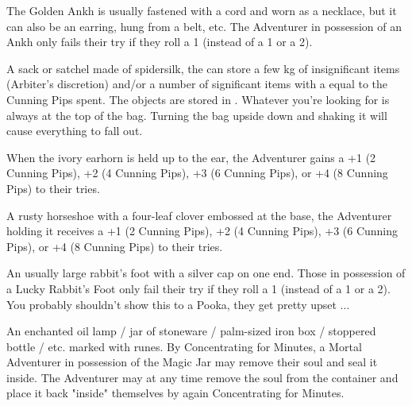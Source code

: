 \MARVELS[
  Name=Golden Ankh,
  Link=marvels-ankh,
  Pips=8
]

The Golden Ankh is usually fastened with a cord and worn as a necklace, but it can also be an earring, hung from a belt, etc. The Adventurer in possession of an Ankh only fails their  try if they roll a 1 (instead of a 1 or a 2).

\MARVELS[
  Name=Hammerspace Bag,
  Link=marvels-hammerspace-bag,
  Pips=2+
]

A sack or satchel made of spidersilk, the  can store a few kg of insignificant items (Arbiter's discretion) and/or a number of significant items with a  equal to the Cunning Pips spent. The objects are stored in . Whatever you're looking for is always at the top of the bag.  Turning the bag upside down and shaking it will cause everything to fall out.

\MARVELS[
  Name=Ivory Earnhorn,
  Link=marvels-ivory-earhorn,
  Pips=2+
]

When the ivory earhorn is held up to the ear, the Adventurer gains a +1 (2 Cunning Pips), +2 (4 Cunning Pips), +3 (6 Cunning Pips), or +4 (8 Cunning Pips) to their  tries.


\MARVELS[
  Name=Lucky Horseshoe,
  Link=marvels-lucky-horseshoe,
  Pips=2+
]

A rusty horseshoe with a four-leaf clover embossed at the base, the Adventurer holding it receives a +1 (2 Cunning Pips), +2 (4 Cunning Pips), +3 (6 Cunning Pips), or +4 (8 Cunning Pips) to their  tries.


\MARVELS[
  Name=Lucky Rabbit's Foot,
  Link=marvels-lucky-rabbits-foot,
  Pips=8
]

An usually large rabbit's foot with a silver cap on one end. Those in possession of a Lucky Rabbit's Foot only fail their  try if they roll a 1 (instead of a 1 or a 2). You probably shouldn't show this to a Pooka, they get pretty upset ...


\MARVELS[
  Name=Magic Jar,
  Link=marvels-magic-jar,
  Pips=12
]

An enchanted oil lamp / jar of stoneware / palm-sized iron box / stoppered bottle / etc. marked with runes. By Concentrating for Minutes, a Mortal Adventurer in possession of the Magic Jar may remove their soul and seal it inside. The Adventurer may at any time remove the soul from the container and place it back "inside" themselves by again Concentrating for Minutes.

